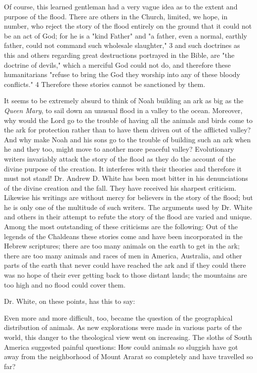 Of course, this learned gentleman had a very vague idea as to the extent and purpose of the
flood. There are others in the Church, limited, we hope, in number, who reject the story of
the flood entirely on the ground that it could not be an act of God; for he is a "kind Father"
and "a father, even a normal, earthly father, could not command such wholesale slaughter," 3
and such doctrines as this and others regarding great destructions portrayed in the Bible, are
"the doctrine of devils," which a merciful God could not do, and therefore these
humanitarians "refuse to bring the God they worship into any of these bloody conflicts." 4
Therefore these stories cannot be sanctioned by them.

It seems to be extremely absurd to think of Noah building an ark as big as the \textit{Queen Mary},
to sail down an unusual flood in a valley to the ocean. Moreover, why would the Lord go to
the trouble of having all the animals and birds come to the ark for protection rather than to
have them driven out of the afflicted valley? And why make Noah and his sons go to the
trouble of building such an ark when he and they too, might move to another more peaceful
valley? Evolutionary writers invariably attack the story of the flood as they do the account of
the divine purpose of the creation. It interferes with their theories and therefore it must not
stand! Dr. Andrew D. White has been most bitter in his denunciations of the divine creation
and the fall. They have received his sharpest criticism. Likewise his writings are without
mercy for believers in the story of the flood; but he is only one of the multitude of such
writers. The arguments used by Dr. White and others in their attempt to refute the story of the
flood are varied and unique. Among the most outstanding of these criticisms are the
following: Out of the legends of the Chaldeans these stories come and have been
incorporated in the Hebrew scriptures; there are too many animals on the earth to get in the
ark; there are too many animals and races of men in America, Australia, and other parts of
the earth that never could have reached the ark and if they could there was no hope of their
ever getting back to those distant lands; the mountains are too high and no flood could cover
them.

Dr. White, on these points, has this to say:

Even more and more difficult, too, became the question of the geographical distribution of
animals. As new explorations were made in various parts of the world, this danger to the
theological view went on increasing. The sloths of South America suggested painful
questions: How could animals so sluggish have got away from the neighborhood of Mount
Ararat so completely and have travelled so far?

